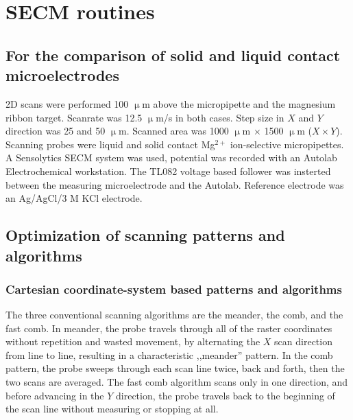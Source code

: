 	\section{SECM routines}
		\subsection{For the comparison of solid and liquid contact microelectrodes}
2D scans were performed 100 $\upmu$m above the micropipette and the magnesium ribbon target.
Scanrate was 12.5 $\upmu$m/s in both cases.
Step size in $X$ and $Y$ direction was 25 and 50 $\upmu$m.
Scanned area was 1000 $\upmu$m $\times$ 1500 $\upmu$m ($X\times Y$).
Scanning probes were liquid and solid contact Mg$^{2+}$ ion-selective micropipettes.
A Sensolytics SECM system was used, potential was recorded with an Autolab Electrochemical workstation.
The TL082 voltage based follower was insterted between the measuring microelectrode and the Autolab.
Reference electrode was an Ag/AgCl/3 M KCl electrode.
		\subsection{Optimization of scanning patterns and algorithms}
			\subsubsection{Cartesian coordinate-system based patterns and algorithms}
The three conventional scanning algorithms are the meander, the comb, and the fast comb.
In meander, the probe travels through all of the raster coordinates without repetition and wasted movement, by alternating the $X$ scan direction from line to line, resulting in a characteristic ,,meander'' pattern.
In the comb pattern, the probe sweeps through each scan line twice, back and forth, then the two scans are averaged.
The fast comb algorithm scans only in one direction, and before advancing in the $Y$ direction, the probe travels back to the beginning of the scan line without measuring or stopping at all.


